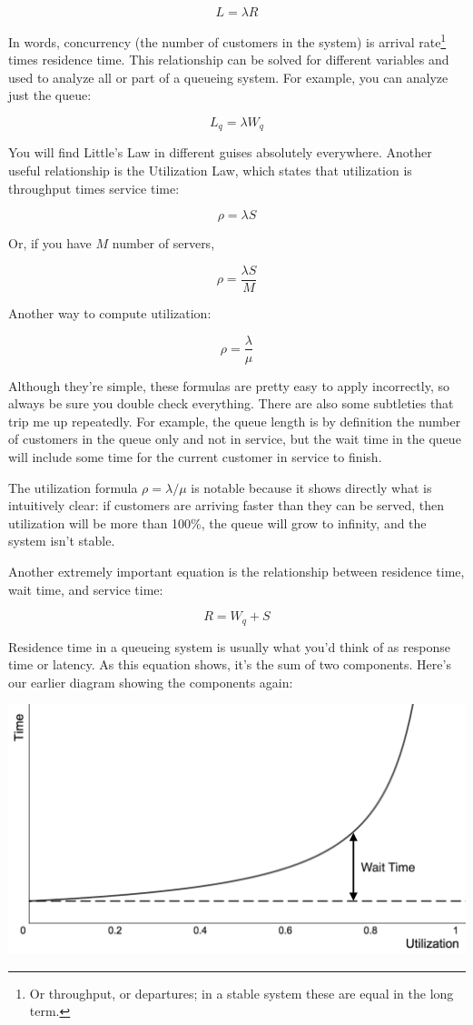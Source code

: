 \documentclass{vivid_layout_pdf}
\begin{document}
\[
   L = \lambda R
\]

In words, concurrency (the number of customers in the system) is arrival rate\footnote{Or throughput, or departures; in a stable system these are equal in the long term.} times residence time. This relationship can be solved for different variables and used to analyze all or part of a queueing system. For example, you can analyze just the queue:

\[
  L_q = \lambda  W_q
\]

You will find Little's Law in different guises absolutely everywhere. Another useful relationship is the Utilization Law, which states that utilization is throughput times service time:

\[
 \rho = \lambda  S
\]

Or, if you have $M$ number of servers,

\[
 \rho = \frac{ \lambda S }{M}
\]

Another way to compute utilization:

\[
 \rho = \frac{\lambda}{ \mu}
\]

Although they're simple, these formulas are pretty easy to apply incorrectly, so always be sure you double check everything. There are also some subtleties that trip me up repeatedly. For example, the queue length is by definition the number of customers in the queue only and not in service, but the wait time in the queue will include some time for the current customer in service to finish.

The utilization formula \(\rho = \lambda / \mu\) is notable because it shows directly what is intuitively clear: if customers are arriving faster than they can be served, then utilization will be more than 100\%, the queue will grow to infinity, and the system isn't stable.

Another extremely important equation is the relationship between residence time, wait time, and  service time:

\[
 R = W_q + S
\]

Residence time in a queueing system is usually what you'd think of as response time or latency. As this equation shows, it's the sum of two components.  Here's our earlier diagram showing the components again:

\begin{center}
\includegraphics[width=.75\linewidth]{hockey-stick-1}
\end{center}
\end{document}
